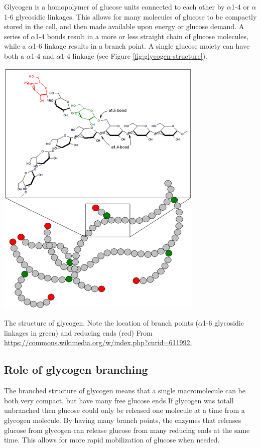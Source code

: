 \documentclass{tufte-handout}
\begin{document}
Glycogen is a homopolymer of glucose units connected to each other by $\alpha$1-4 or $\alpha$1-6 glycosidic linkages.  This allows for many molecules of glucose to be compactly stored in the cell, and then made available upon energy or glucose demand.  A series of $\alpha$1-4 bonds result in a more or less straight chain of glucose molecules, while a $\alpha$1-6 linkage results in a branch point.  A single glucose moiety can have both a $\alpha$1-4 and $\alpha$1-4 linkage (see Figure \ref{fig:glycogen-structure}).  

\begin{marginfigure}
\includegraphics{figures/Glycogen.png}
\caption{The structure of glycogen.  Note the location of branch points ($\alpha$1-6 glycosidic linkages in green) and reducing ends (red) From \url{https://commons.wikimedia.org/w/index.php?curid=611992.}}
\label{fig:glycogen-structure}
\end{marginfigure}


\subsection{Role of glycogen branching}

The branched structure of glycogen means that a single macromolecule can be both very compact, but have many free glucose ends  If glycogen was totall unbranched then glucose could only be released one molecule at a time from a glycogen molecule.  By having many branch points, the enzymes that releases glucose from glycogen can release glucose from many reducing ends at the same time.  This allows for more rapid mobilization of glucose when needed.  
\end{document}
